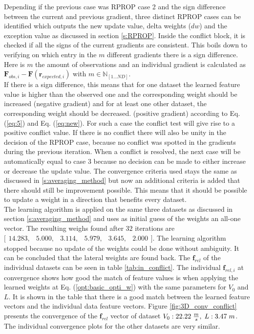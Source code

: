Depending if the previous case was RPROP case 2 and the sign difference between the current and previous gradient, three distinct RPROP cases can be identified which outputs the new update value, delta weights ($dw$) and the exception value as discussed in section \ref{s:RPROP}. Inside the conflict block, it is checked if all the signs of the current gradients are consistent. This boils down to verifying on which entry in the $m$ different gradients there is a sign difference. Here is $m$ the amount of observations and an individual gradient is calculated as  $\bm{F}_{obs,i} - \bm{F}(\bm{r}_{expected,i})$ with $m \in \mathbb{N}_{[1\dots ND]}$. \\ 

If there is a sign difference, this means that for one dataset the learned feature value is higher than the observed one and the corresponding weight should be increased (negative gradient) and for at least one other dataset, the corresponding weight should be decreased. (positive gradient) according to Eq. (\ref{eq:5}) and Eq. (\ref{eq:new}). For such a case the conflict test will give rise to a positive conflict value. If there is no conflict there will also be unity in the decision of the RPROP case, because no conflict was spotted in the gradients during the previous iteration. When a conflict is resolved, the next case will be automatically equal to case 3 because no decision can be made to either increase or decrease the update value. The convergence criteria used stays the same as discussed in \ref{s:averaging_method} but now an additional criteria is added that there should still be improvement possible. This means that it should be possible to update a weight in a direction that benefits every dataset.\\

The learning algorithm is applied on the same three datasets as discussed in section \ref{s:averaging_method} and uses as initial guess of the weights an all-one vector. The resulting weighs found after $32$ iterations are  $\bigl[ \begin{smallmatrix} 14.283,&5.000,&3.114,&5.979,&3.645,&2.000\end{smallmatrix}\bigr]$. The learning algorithm stopped because no update of the weights could be done without ambiguity. It can be concluded that the lateral weights are found back. The $\bm{f}_{rel}$ of the individual datasets can be seen in table \ref{tab:in_conflict}. The individual $\bm{f}_{rel,i}$ at convergence shows how good the match of feature values is when applying the learned weights at Eq. (\ref{opt:basic_opti_w}) with the same parameters for $V_0$ and $L$. It is shown in the table that there is a good match between the learned feature vectors and the individual data feature vectors. Figure \ref{fig:3D_conv_conflict} presents the convergence of the $\bm{f}_{rel}$ vector of dataset $V_0:22.22\hspace{1mm}\frac{m}{s},\hspace{1mm} L:3.47\hspace{1mm}m$. The individual convergence plots for the other datasets are very similar.

